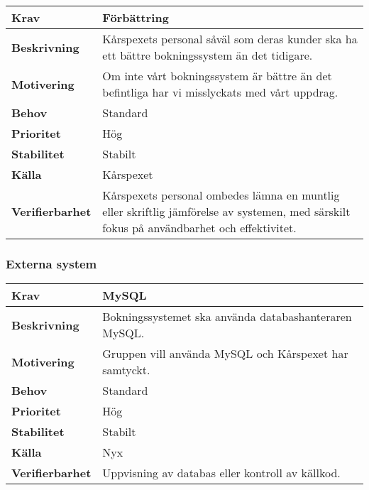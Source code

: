 \documentclass[a4paper, twoside, 11pt, titlepage]{article}
\begin{document}
		\begin{tabular} { p{2.6cm} p{12.5cm} }
			\hline
			\sffamily\textbf{Krav} & Förbättring  \\
			\hline
			\sffamily\textbf{Beskrivning} & Kårspexets personal såväl som deras kunder ska ha ett bättre bokningssystem än det tidigare.  \\
			\hline
			\sffamily\textbf{Motivering} & Om inte vårt bokningssystem är bättre än det befintliga har vi misslyckats med vårt uppdrag.  \\
			\hline
			\sffamily\textbf{Behov} & Standard  \\
			\hline
			\sffamily\textbf{Prioritet} & Hög  \\
			\hline
			\sffamily\textbf{Stabilitet} & Stabilt  \\
			\hline
			\sffamily\textbf{Källa} & Kårspexet  \\
			\hline
			\sffamily\textbf{Verifierbarhet} & Kårspexets personal ombedes lämna en muntlig eller skriftlig jämförelse av systemen, med särskilt fokus på användbarhet och effektivitet.  \\
			\hline
		\end{tabular}


		\subsubsection{Externa system}


		\begin{tabular} { p{2.6cm} p{12.5cm} }
			\hline
			\sffamily\textbf{Krav} & MySQL  \\
			\hline
			\sffamily\textbf{Beskrivning} & Bokningssystemet ska använda databashanteraren MySQL.  \\
			\hline
			\sffamily\textbf{Motivering} & Gruppen vill använda MySQL och Kårspexet har samtyckt.  \\
			\hline
			\sffamily\textbf{Behov} & Standard  \\
			\hline
			\sffamily\textbf{Prioritet} & Hög  \\
			\hline
			\sffamily\textbf{Stabilitet} & Stabilt  \\
			\hline
			\sffamily\textbf{Källa} & Nyx  \\
			\hline
			\sffamily\textbf{Verifierbarhet} & Uppvisning av databas eller kontroll av källkod.  \\
			\hline
		\end{tabular}
		\vspace{6mm}
\end{document}
